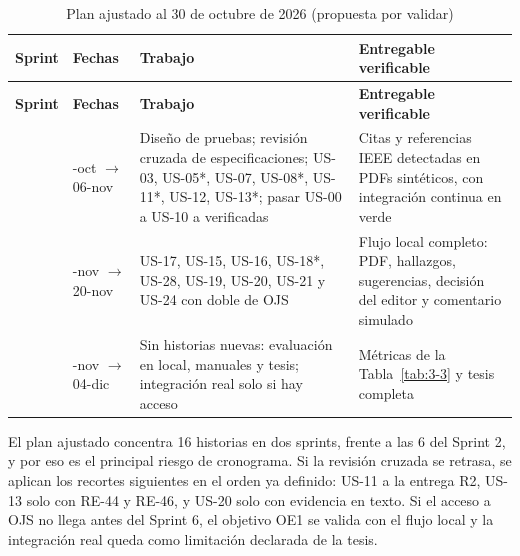 {\small
\begin{longtable}{@{}>{\raggedright\arraybackslash}p{}>{\raggedright\arraybackslash}p{}>{\raggedright\arraybackslash}p{}>{\raggedright\arraybackslash}p{}@{}}
\caption{Plan ajustado al 30 de octubre de 2026 (propuesta por validar)}\label{tab:3-7}\\
\toprule
\textbf{Sprint} & \textbf{Fechas} & \textbf{Trabajo} & \textbf{Entregable verificable} \\
\midrule
\endfirsthead
\toprule
\textbf{Sprint} & \textbf{Fechas} & \textbf{Trabajo} & \textbf{Entregable verificable} \\
\midrule
\endhead
\bottomrule
\endfoot
\endlastfoot
4 & 26-oct $\rightarrow$ 06-nov & Diseño de pruebas; revisión cruzada de especificaciones; US-03, US-05*, US-07, US-08*, US-11*, US-12, US-13*; pasar US-00 a US-10 a verificadas & Citas y referencias IEEE detectadas en PDFs sintéticos, con integración continua en verde \\
5 & 09-nov $\rightarrow$ 20-nov & US-17, US-15, US-16, US-18*, US-28, US-19, US-20, US-21 y US-24 con doble de OJS & Flujo local completo: PDF, hallazgos, sugerencias, decisión del editor y comentario simulado \\
6 & 23-nov $\rightarrow$ 04-dic & Sin historias nuevas: evaluación en local, manuales y tesis; integración real solo si hay acceso & Métricas de la Tabla~\ref{tab:3-3} y tesis completa \\
\end{longtable}
}

El plan ajustado concentra 16 historias en dos sprints, frente a las 6 del Sprint 2, y por eso es el principal riesgo de cronograma. Si la revisión cruzada se retrasa, se aplican los recortes siguientes en el orden ya definido: US-11 a la entrega R2, US-13 solo con RE-44 y RE-46, y US-20 solo con evidencia en texto. Si el acceso a OJS no llega antes del Sprint 6, el objetivo OE1 se valida con el flujo local y la integración real queda como limitación declarada de la tesis.

